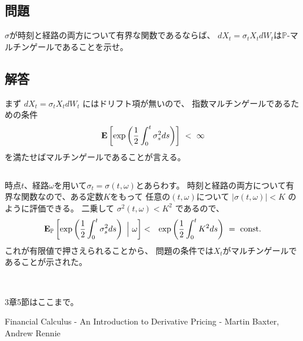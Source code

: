 \documentclass[uplatex,a4j,12pt,dvipdfmx]{jsarticle}
\begin{document}
\subsection{問題}

$\sigma$が時刻と経路の両方について有界な関数であるならば、
$dX_{t} = \sigma_{t} X_{t} dW_{t}$は$\mathbb{P}$-マルチンゲールであることを示せ。
\subsection{解答}

まず
$dX_{t} = \sigma_{t} X_{t} dW_{t}$
にはドリフト項が無いので、
指数マルチンゲールであるための条件
$$
	{\bf E}
	\left[
		\exp
		\left(
		\dfrac{1}{2}
		\int^{t}_{0} \sigma_{s}^{2} ds
		\right)
		\right]
	\ < \
	\infty
$$
を満たせばマルチンゲールであることが言える。

${}$

時点$t$、経路$\omega$を用いて$\sigma_{t}=\sigma(t,\omega)$とあらわす。
時刻と経路の両方について有界な関数なので、ある定数$K$をもって
任意の$(t,\omega)$について
$
	| \sigma(t,\omega) | < K
$
のように評価できる。
二乗して
$
	\sigma^{2}(t,\omega) < K^{2}
$
であるので、
%
\begin{eqnarray*}
	{\bf E}_{\mathbb{P}}
	\left[
		\exp
		\left(
		\dfrac{1}{2}
		\int^{t}_{0} \sigma_{s}^{2} ds
		\right)
		\
		\Big|
		\
		\omega
		\right]
	&<&
	\exp
	\left(
	\dfrac{1}{2}
	\int^{t}_{0} K^{2} ds
	\right)
	\ = \
	{\rm const.}
\end{eqnarray*}
%
これが有限値で押さえられることから、
問題の条件では$X_{t}$がマルチンゲールであることが示された。

${}$

\ \\

3章5節はここまで。

\begin{thebibliography}{9}
	Financial Calculus - An Introduction to Derivative Pricing - Martin Baxter, Andrew Rennie
\end{thebibliography}
\end{document}
